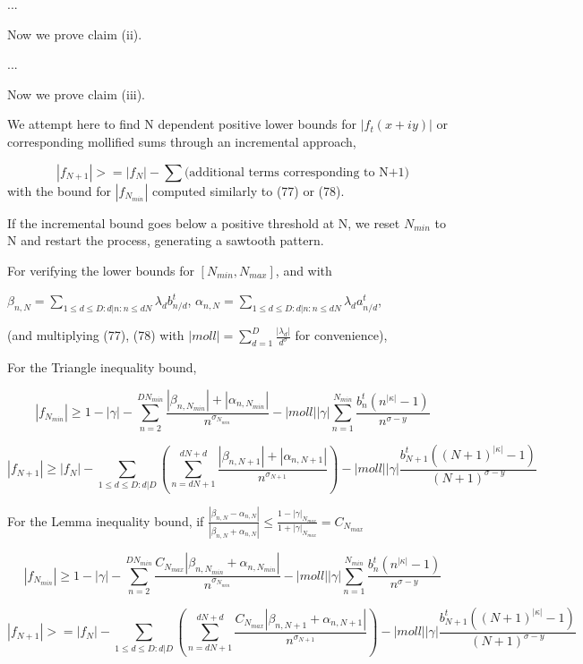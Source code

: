 ...


Now we prove claim (ii).

...

Now we prove claim (iii).

We attempt here to find N dependent positive lower bounds for $|f_{t}(x+iy)|$ or corresponding mollified sums through an incremental approach,

$$ |f_{N+1}| >= |f_{N}| - \sum \textrm{(additional terms corresponding to N+1)}$$
with the bound for $|f_{N_{min}}|$ computed similarly to (77) or (78).

If the incremental bound goes below a positive threshold at N, we reset $N_{min}$ to N and restart the process, generating a sawtooth pattern.

For verifying the lower bounds for $[N_{min},N_{max}]$, and with

$\beta_{n,N} = \sum\limits_{1 \leq d \leq D:d|n:n \leq dN} \lambda_{d} b_{n/d}^{t}$, $\alpha_{n,N} = \sum\limits_{1 \leq d \leq D:d|n:n \leq dN} \lambda_{d} a_{n/d}^{t}$, 

(and multiplying (77), (78) with $|moll| = \sum_{d=1}^D \frac{|\lambda_d|}{d^\sigma}$ for convenience),


For the Triangle inequality bound,

$$|f_{N_{min}}| \geq 1 - |\gamma| - \sum\limits_{n=2}^{DN_{min}} \frac{|\beta_{n,N_{min}}| + |\alpha_{n,N_{min}}|}{n^{\sigma_{N_{min}}}} - |moll||\gamma| \sum_{n=1}^{N_{min}} \frac{b_n^t (n^{|\kappa|} - 1)}{n^{\sigma-y}}$$


$$|f_{N+1}| \geq |f_{N}| - \sum\limits_{1 \leq d \leq D:d|D}(\sum\limits_{n=dN+1}^{dN+d} \frac{|\beta_{n,N+1}| + |\alpha_{n,N+1}|}{n^{\sigma_{N+1}}}) - |moll||\gamma| \frac{b_{N+1}^t ({(N+1)}^{|\kappa|} - 1)}{(N+1)^{\sigma-y}}$$

For the Lemma inequality bound, if $\frac{|\beta_{n,N} - \alpha_{n,N}|}{|\beta_{n,N} + \alpha_{n,N}|} \leq \frac{1-|\gamma|_{N_{max}}}{1+|\gamma|_{N_{max}}} = C_{N_{max}}$


$$|f_{N_{min}}| \geq 1 - |\gamma| - \sum\limits_{n=2}^{DN_{min}}  \frac{C_{N_{max}}|\beta_{n,N_{min}} + \alpha_{n,N_{min}}|}{n^{\sigma_{N_{min}}}}  - |moll||\gamma| \sum_{n=1}^{N_{min}} \frac{b_n^t (n^{|\kappa|} - 1)}{n^{\sigma-y}}$$


$$|f_{N+1}| >= |f_{N}| - \sum\limits_{1 \leq d \leq D:d|D}(\sum\limits_{n=dN+1}^{dN+d} \frac{C_{N_{max}} |\beta_{n,N+1} + \alpha_{n,N+1}|}{n^{\sigma_{N+1}}})  - |moll||\gamma| \frac{b_{N+1}^t ({(N+1)}^{|\kappa|} - 1)}{(N+1)^{\sigma-y}}$$

